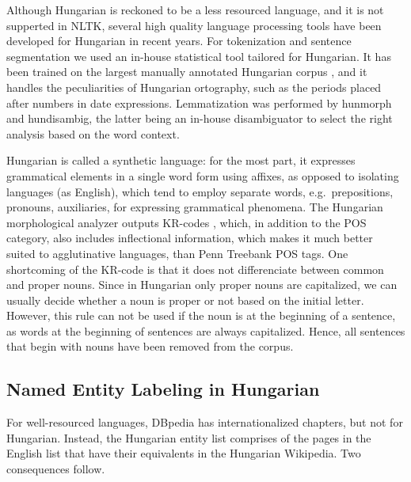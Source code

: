 \documentclass[11pt]{article}
\begin{document}
Although Hungarian is reckoned to be a less resourced language, and it is not supperted in NLTK, several high quality language processing tools have been developed for Hungarian in recent years. For tokenization and sentence segmentation we used an in-house statistical tool tailored for Hungarian. It has been trained on the largest manually annotated Hungarian corpus \cite{Csendes:04}, and it handles the peculiarities of Hungarian ortography, such as the periods placed after numbers in date expressions. Lemmatization was performed by hunmorph \cite{Tron:05} and hundisambig, the latter being an in-house disambiguator to select the right analysis based on the word context. 


Hungarian is called a synthetic language: for the most part, it expresses grammatical elements in a single word form using affixes, as opposed to isolating languages (as English), which tend to employ separate words, e.g.~prepositions, pronouns, auxiliaries, for expressing grammatical phenomena. The Hungarian morphological analyzer outputs KR-codes \cite{Kornai:04}, which, in addition to the POS category, also includes inflectional information, which makes it much better suited to agglutinative languages, than Penn Treebank POS tags. One shortcoming of the KR-code is that it does not differenciate between common and proper nouns. Since in Hungarian only proper nouns are capitalized, we can usually decide whether a noun is proper or not based on the initial letter. However, this rule can not be used if the noun is at the beginning of a sentence, as words at the beginning of sentences are always capitalized. Hence, all sentences that begin with nouns have been removed from the corpus.

\subsection{Named Entity Labeling in Hungarian}

For well-resourced languages, DBpedia has internationalized chapters, 
but not for Hungarian. Instead, the Hungarian entity list comprises of the pages in the English list that have their equivalents in the Hungarian Wikipedia. Two consequences follow.
\end{document}

